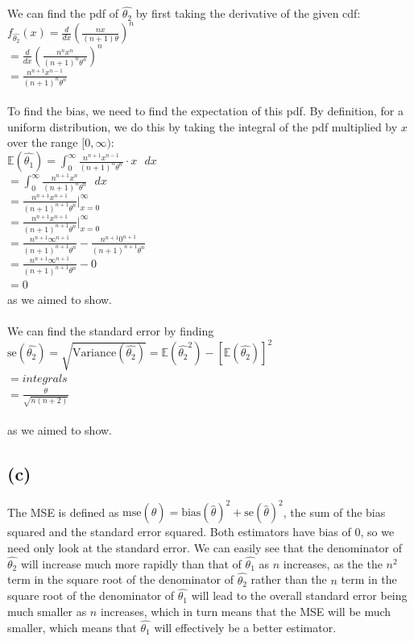 \documentclass{article}
\begin{document}
{We can find the pdf of $\hat{\theta_2}$ by first taking the derivative of the given cdf: \\ 
$f_{\hat{\theta_2}}(x) = \frac{d}{dx} (\frac{nx}{(n+1)\theta})^n$ \\
$= \frac{d}{dx} (\frac{n^nx^n}{(n+1)^n\theta^n})^n$ \\
$= \frac{n^{n+1}x^{n-1}}{(n+1)^n\theta^n}$ \\ \\
To find the bias, we need to find the expectation of this pdf. By definition, for a uniform distribution, we do this by taking the integral of the pdf multiplied by $x$ over the range $[0, \infty)$: \\
$\mathbb{E}(\hat{\theta_1}) = \int_{0}^{\infty}\frac{n^{n+1}x^{n-1}}{(n+1)^n\theta^n} \cdot x \text{ } dx $ \\
$= \int_{0}^{\infty}\frac{n^{n+1}x^n}{(n+1)^n\theta^n} \text{ } dx $ \\ 
$= \frac{n^{n+1}x^{n+1}}{(n+1)^{n+1}\theta^n} |_{x=0}^{\infty} $ \\ 
$= \frac{n^{n+1}x^{n+1}}{(n+1)^{n+1}\theta^n} |_{x=0}^{\infty} $ \\
$= \frac{n^{n+1}\infty^{n+1}}{(n+1)^{n+1}\theta^n} - \frac{n^{n+1}0^{n+1}}{(n+1)^{n+1}\theta^n} $ \\
$= \frac{n^{n+1}\infty^{n+1}}{(n+1)^{n+1}\theta^n} - 0$ \\ 
$= 0$ \\
as we aimed to show. \\ \\
We can find the standard error by finding $\text{se}(\hat{\theta_2}) = \sqrt{\text{Variance}(\hat{\theta_2})} = \mathbb{E}(\hat{\theta_2}^2) - [\mathbb{E}(\hat{\theta_2})]^2$ \\ 
$= integrals$ \\
$= \frac{\theta}{\sqrt{n(n+2)}}$ \\ \\
as we aimed to show.
% 

\subsection*{(c)}

The MSE is defined as $\text{mse}(\hat{\theta}) = \text{bias}(\hat{\theta})^2 + \text{se}(\hat{\theta})^2$, the sum of the bias squared and the standard error squared. Both estimators have bias of 0, so we need only look at the standard error. We can easily see that the denominator of $\hat{\theta_2}$ will increase much more rapidly than that of $\hat{\theta_1}$ as $n$ increases, as the the $n^2$ term in the square root of the denominator of $\hat{\theta_2}$ rather than the $n$ term in the square root of the denominator of $\hat{\theta_1}$ will lead to the overall standard error being much smaller as $n$ increases, which in turn means that the MSE will be much smaller, which means that $\hat{\theta_1}$ will effectively be a better estimator.

}
\end{document}
